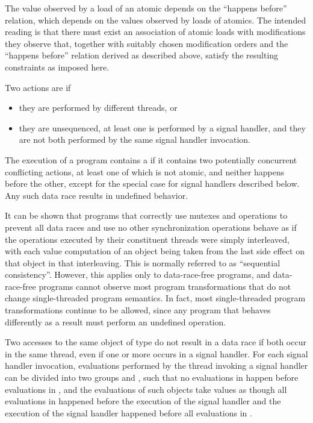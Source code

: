 \pnum
\begin{note} The value observed by a load of an atomic depends on the ``happens
before'' relation, which depends on the values observed by loads of atomics.
The intended reading is that there must exist an
association of atomic loads with modifications they observe that, together with
suitably chosen modification orders and the ``happens before'' relation derived
as described above, satisfy the resulting constraints as imposed here. \end{note}

\pnum
Two actions are  if
\begin{itemize}
\item they are performed by different threads, or
\item they are unsequenced, at least one is performed by a signal handler, and
they are not both performed by the same signal handler invocation.
\end{itemize}
The execution of a program contains a  if it contains two
potentially concurrent conflicting actions, at least one of which is not atomic,
and neither happens before the other,
except for the special case for signal handlers described below.
Any such data race results in undefined
behavior. \begin{note} It can be shown that programs that correctly use mutexes
and  operations to prevent all data races and use no
other synchronization operations behave as if the operations executed by their
constituent threads were simply interleaved, with each
%
value computation of an
object being taken from the last
%
side effect on that object in that
interleaving. This is normally referred to as ``sequential consistency''.
However, this applies only to data-race-free programs, and data-race-free
programs cannot observe most program transformations that do not change
single-threaded program semantics. In fact, most single-threaded program
transformations continue to be allowed, since any program that behaves
differently as a result must perform an undefined operation. \end{note}

\pnum
Two accesses to the same object of type  do not
result in a data race if both occur in the same thread, even if one or more
occurs in a signal handler. For each signal handler invocation, evaluations
performed by the thread invoking a signal handler can be divided into two
groups  and , such that no evaluations in
 happen before evaluations in , and the
evaluations of such  objects take values as though
all evaluations in  happened before the execution of the signal
handler and the execution of the signal handler happened before all evaluations
in .

